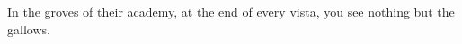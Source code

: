 \documentclass[MAIN]{subfiles}
\begin{document}
In the groves of their academy, at the end of every vista, you see nothing but the gallows.
\end{document}
